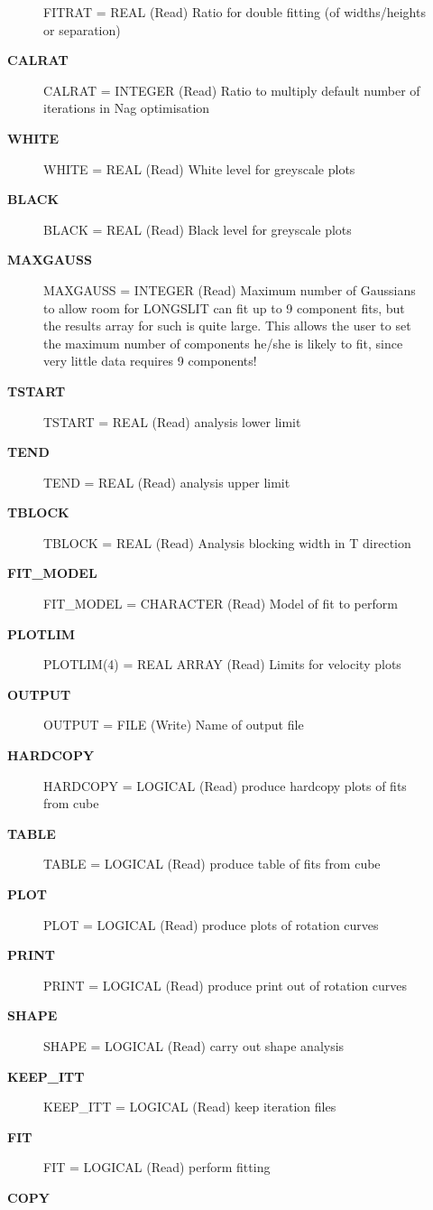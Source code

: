 \begin{description}
\begin{description}
   FITRAT = REAL (Read)
        Ratio for double fitting (of widths/heights or separation)
\item [{\bf CALRAT}]
   CALRAT = INTEGER (Read)
        Ratio to multiply default number of iterations in Nag
                 optimisation
\item [{\bf WHITE}]
   WHITE = REAL (Read)
        White level for greyscale plots
\item [{\bf BLACK}]
   BLACK = REAL (Read)
        Black level for greyscale plots
\item [{\bf MAXGAUSS}]
   MAXGAUSS = INTEGER (Read)
        Maximum number of Gaussians to allow room for
                 LONGSLIT can fit up to 9 component fits, but the results
                 array for such is quite large. This allows the user to set
                 the maximum number of components he/she is likely to fit,
                since very little data requires 9 components!
\item [{\bf TSTART}]
   TSTART = REAL (Read)
        analysis lower limit
\item [{\bf TEND}]
   TEND = REAL (Read)
        analysis upper limit
\item [{\bf TBLOCK}]
   TBLOCK = REAL (Read)
        Analysis blocking width in T direction
\item [{\bf FIT_MODEL}]
   FIT_MODEL = CHARACTER (Read)
        Model of fit to perform
\item [{\bf PLOTLIM}]
   PLOTLIM(4) = REAL ARRAY (Read)
        Limits for velocity plots
\item [{\bf OUTPUT}]
   OUTPUT = FILE (Write)
        Name of output file
\item [{\bf HARDCOPY}]
   HARDCOPY = LOGICAL (Read)
        produce hardcopy plots of fits from cube
\item [{\bf TABLE}]
   TABLE = LOGICAL (Read)
        produce table of fits from cube
\item [{\bf PLOT}]
   PLOT = LOGICAL (Read)
        produce plots of rotation curves
\item [{\bf PRINT}]
   PRINT = LOGICAL (Read)
        produce print out of rotation curves
\item [{\bf SHAPE}]
   SHAPE = LOGICAL (Read)
        carry out shape analysis
\item [{\bf KEEP_ITT}]
   KEEP_ITT = LOGICAL (Read)
        keep iteration files
\item [{\bf FIT}]
   FIT = LOGICAL (Read)
        perform fitting
\item [{\bf COPY}]

\end{description}
\end{description}
